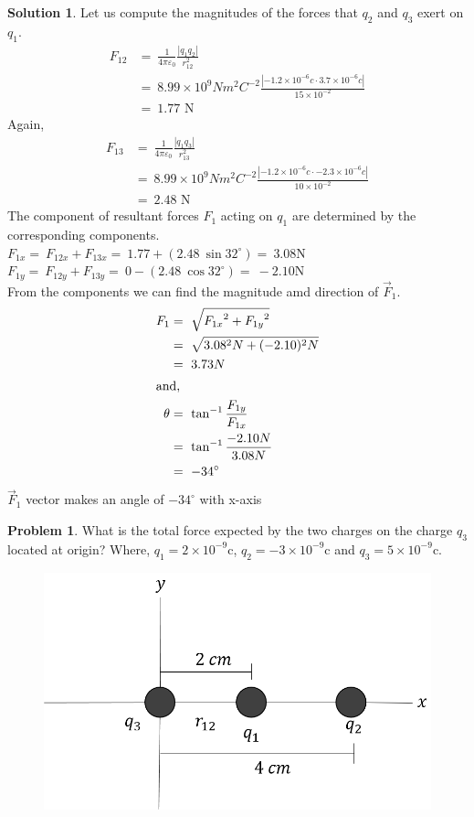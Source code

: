 \documentclass[12pt]{article}
\theoremstyle{definition}
\newtheorem{prob}{Problem}[section]
\newtheorem*{soln}{Solution}
\newcommand{\K}{\frac{1}{4\pi\varepsilon_0}}
\newcommand{\abs}[1]{\left\vert#1\right\vert}
\newcommand{\e}[1]{\times10^{#1}}
\begin{document}
\begin{soln}
    Let us compute the magnitudes of the forces that $ q_2 $ and $ q_3 $ exert on $ q_1 $.
    \begin{align*}
        F_{12} &=\ \K \frac{\abs{q_1q_2}}{r_{12}^2}\\
         &=\ 8.99\times10^9 Nm^2C^{-2} \frac{\abs{-1.2\e{-6}c\cdot 3.7\e{-6}c}}{15\e{-2}}\\
         &=\ 1.77 \text{ N}
    \end{align*}
    Again, 
    \begin{align*}
        F_{13} &=\ \K \frac{\abs{q_1q_3}}{r_{13}^2}\\
         &=\ 8.99\e{9} Nm^2C^{-2} \frac{\abs{-1.2\e{-6}c\cdot -2.3\e{-6}c}}{10\e{-2}}\\
         &=\ 2.48 \text{ N}
    \end{align*}
    The component of resultant forces $ F_1 $ acting on $ q_1 $ are determined by the corresponding components.\\
    $ F_{1x}=\ F_{12x}+F_{13x}=\ 1.77+ (2.48\  \sin 32^\circ)=\ 3.08 $N\\
    $ F_{1y}=\ F_{12y}+F_{13y}=\ 0- (2.48\  \cos 32^\circ)=\ -2.10 $N\\
    From the components we can find the magnitude amd direction of $ \vec{F}_1 $.
    \begin{align*}
        F_1 &=\ \sqrt{{F_{1x}}^2+{F_{1y}}^2}\\
        &=\ \sqrt{3.08^2 N+(-2.10)^2 N}\\
        &=\ 3.73 N\\
        \intertext{and,}
        \theta &=\ \tan^{-1} \frac{F_{1y}}{F_{1x}}\\
        &=\ \tan^{-1} \frac{-2.10 N}{3.08 N}\\
        &=\ -34^\circ
    \end{align*}
    $ \vec{F}_1 $ vector makes an angle of $ -34^\circ $ with x-axis
\end{soln}
\begin{prob}
    What is the total force expected by the two charges on the charge $ q_3 $ located at origin? Where, $ q_1=2\e{-9} $c, $ q_2=-3\e{-9} $c and $ q_3=5\e{-9} $c.
    \begin{figure}[h]
        \centering
        \includegraphics[scale=.5]{4.png}
        \label{fig:prob2}
    \end{figure}
\end{prob}
\end{document}
